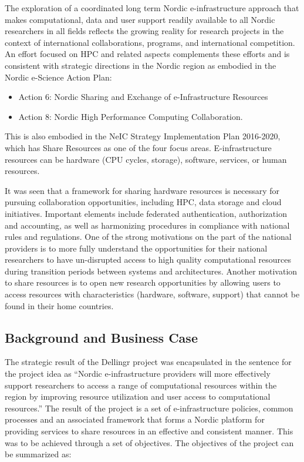 \documentclass{article}
\newcommand{\dell}{Dellingr\xspace}
\begin{document}
The exploration of a coordinated long term Nordic e-infrastructure approach that makes computational, data and user support readily available to all Nordic researchers in all fields reflects the growing reality for research projects in the context of international collaborations, programs, and international competition.
An effort focused on HPC and related aspects complements these efforts and is consistent with strategic directions in the Nordic region as embodied in the Nordic e-Science Action Plan:
\begin{itemize}
\item Action 6: Nordic Sharing and Exchange of e-Infrastructure Resources
\item Action 8: Nordic High Performance Computing Collaboration.
\end{itemize}

This is also embodied in the NeIC Strategy Implementation Plan 2016-2020, which has Share Resources as one of the four focus areas. E-infrastructure resources can be hardware (CPU cycles, storage), software, services, or human resources. 

It was seen that a framework for sharing hardware resources is necessary for pursuing collaboration opportunities, including HPC, data storage and cloud initiatives. 
Important elements include federated authentication, authorization and accounting, as well as harmonizing procedures in compliance with national rules and regulations. 
One of the strong motivations on the part of the national providers is to more fully understand the opportunities for their national researchers to have un-disrupted access to high quality computational resources during transition periods between systems and architectures. 
Another motivation to share resources is to open new research opportunities by allowing users to access resources with characteristics (hardware, software, support) that cannot be found in their home countries.


\subsection{Background and Business Case}
\label{ssec:background}

The strategic result of the \dell project was encapsulated 
in the sentence for the project idea as ``Nordic e-infrastructure providers will more effectively support researchers to access a range of computational
resources within the region by improving resource utilization and user access to computational resources.''
The result of the project is a set of e-infrastructure policies, common processes and an associated framework that forms a Nordic platform for providing services to share resources in an effective and consistent manner.
This was to be achieved through a set of objectives.
The objectives of the project can be summarized as: \\
\end{document}
